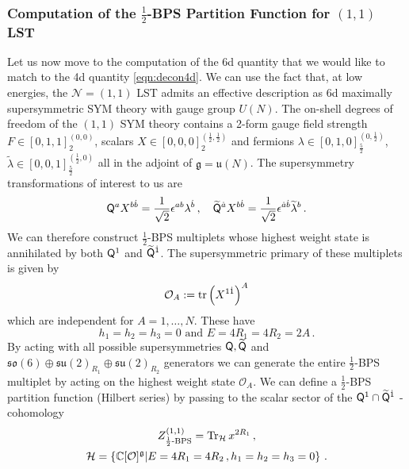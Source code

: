 \documentclass[main.tex]{subfiles}
\begin{document}
\subsubsection{Computation of the $\frac{1}{2}$-BPS Partition Function for $(1,1)$ LST}
Let us now move to the computation of the 6d quantity that we would like to match to the 4d quantity \eqref{eqn:decon4d}. We can use the fact that, at low energies, the $\mathcal{N}=(1,1)$ LST admits an effective description as 6d maximally supersymmetric SYM theory with gauge group $U(N)$.  
The on-shell degrees of freedom of the $(1,1)$ SYM theory contains a 2-form gauge field strength $F\in[0,1,1]_{2}^{(0,0)}$, scalars $X\in[0,0,0]_{2}^{(\frac{1}{2},\frac{1}{2})}$ and fermions $\lambda\in[0,1,0]_{\frac{5}{2}}^{(0,\frac{1}{2})}$, $\widetilde{\lambda}\in[0,0,1]_{\frac{5}{2}}^{(\frac{1}{2},0)}$ all in the adjoint of $\mathfrak{g}=\mathfrak{u}(N)$.
The supersymmetry transformations of interest to us are
\begin{equation}
\mathsf{Q}^{a}X^{b\dot b}=\frac{1}{\sqrt{2}}\epsilon^{ab}\lambda^{\dot b}\,,\quad \widetilde{\mathsf{Q}}^{\dot a}X^{b \dot b}=\frac{1}{\sqrt{2}}\epsilon^{\dot a \dot b}\widetilde{\lambda}^{b}\,.
\end{equation}
We can therefore construct $\frac{1}{2}$-BPS multiplets whose highest weight state is annihilated by both $\mathsf{Q}^1$ and $\widetilde{\mathsf{Q}}^{\dot1}$. The supersymmetric primary of these multiplets is given by
\begin{equation}
\mathcal{O}_A:=\operatorname{tr}\left(X^{1\dot1}\right)^A
\end{equation}
which are independent for $A=1,\dots,N$. These have
\begin{equation}
\text{$h_1=h_2=h_3=0$ and $E=4R_1=4R_2=2A$}\,.
\end{equation}
By acting with all possible supersymmetries $\mathsf{Q},\widetilde{\mathsf{Q}}$ and $\mathfrak{so}(6)\oplus\mathfrak{su}(2)_{R_1}\oplus\mathfrak{su}(2)_{R_2}$ generators we can generate the entire $\frac{1}{2}$-BPS multiplet by acting on the highest weight state $\mathcal{O}_A$.
We can define a $\frac{1}{2}$-BPS partition function (Hilbert series) by passing to the scalar sector of the $\mathsf{Q}^1\cap\widetilde{\mathsf{Q}}^{\dot1}$ -cohomology
\begin{gather}\label{eqn:1comma1BPS}
Z^{(1,1)}_{\text{$\frac{1}{2}$-BPS}}=\operatorname{Tr}_{\mathcal{H}}x^{2R_1}\,,\\ \mathcal{H}=\left\{\mathbb{C}[\mathbf{\mathcal{O}}]^{\mathfrak{g}}\middle|E=4R_1=4R_2\,,h_1=h_2=h_3=0\right\}\,.
\end{gather}
\end{document}
